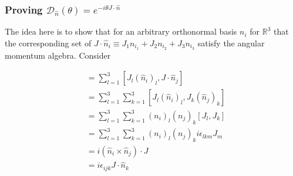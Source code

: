 \documentclass[12pt]{article}
\begin{document}
\subsubsection*{Proving \(\mathscr{D}_{\hat{n}}(\theta) = e^{-i\theta J \cdot \hat{n}}\)}

The idea here is to show that for an arbitrary orthonormal basis \(n_i\) for \(\mathbb{R}^3\) that the corresponding set of \(J \cdot \hat{n}_i \equiv  J_1n_{i_1} + J_2n_{i_2} + J_3n_{i_3}\) satisfy the angular momentum algebra. Consider

\begin{align*}
[J \cdot \hat{n}_i,J \cdot \hat{n}_j] &= \sum_{l=1}^3[J_l(\hat{n}_i)_l,J \cdot \hat{n}_j] \\
&= \sum_{l=1}^{3} \sum_{k=1}^3[J_l(\hat{n}_i)_l,J_k(\hat{n}_j)_k] \\
&=  \sum_{l=1}^{3} \sum_{k=1}^3 (n_i)_l(n_j)_k[J_l,J_k] \\
&=  \sum_{l=1}^{3} \sum_{k=1}^3 (n_i)_l(n_j)_ki\epsilon_{lkm}J_m \\
&= i(\hat{n}_i \times \hat{n}_j)\cdot J \\
&= i\epsilon_{ijk}J \cdot \hat{n}_k
\end{align*}
\end{document}
